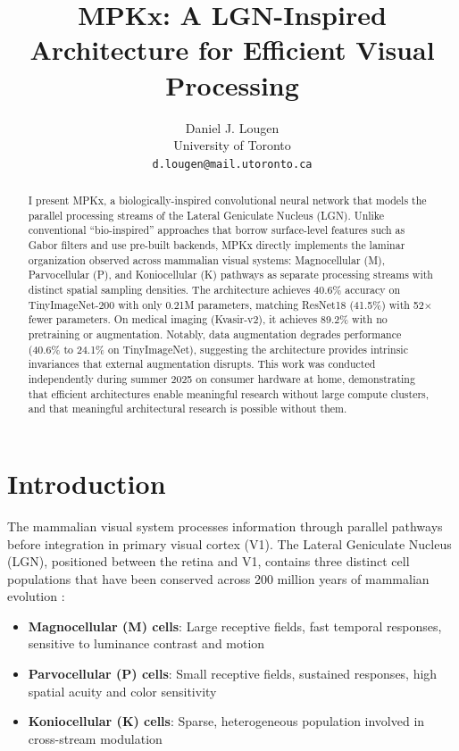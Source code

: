 \documentclass{article}
\title{MPKx: A LGN-Inspired Architecture for Efficient Visual Processing}
\author{
  Daniel J. Lougen \\
  University of Toronto \\
  \texttt{d.lougen@mail.utoronto.ca}
}
\date{}
\begin{document}
\maketitle

\begin{abstract}
I present MPKx, a biologically-inspired convolutional neural network that models the parallel processing streams of the Lateral Geniculate Nucleus (LGN). Unlike conventional ``bio-inspired'' approaches that borrow surface-level features such as Gabor filters and use pre-built backends, MPKx directly implements the laminar organization observed across mammalian visual systems: Magnocellular (M), Parvocellular (P), and Koniocellular (K) pathways as separate processing streams with distinct spatial sampling densities. The architecture achieves 40.6\% accuracy on TinyImageNet-200 with only 0.21M parameters, matching ResNet18 (41.5\%) with 52$\times$ fewer parameters. On medical imaging (Kvasir-v2), it achieves 89.2\% with no pretraining or augmentation. Notably, data augmentation degrades performance (40.6\% to 24.1\% on TinyImageNet), suggesting the architecture provides intrinsic invariances that external augmentation disrupts. This work was conducted independently during summer 2025 on consumer hardware at home, demonstrating that efficient architectures enable meaningful research without large compute clusters, and that meaningful architectural research is possible without them.
\end{abstract}

\section{Introduction}

The mammalian visual system processes information through parallel pathways before integration in primary visual cortex (V1). The Lateral Geniculate Nucleus (LGN), positioned between the retina and V1, contains three distinct cell populations that have been conserved across 200 million years of mammalian evolution \citep{solomon2021}:

\begin{itemize}
    \item \textbf{Magnocellular (M) cells}: Large receptive fields, fast temporal responses, sensitive to luminance contrast and motion
    \item \textbf{Parvocellular (P) cells}: Small receptive fields, sustained responses, high spatial acuity and color sensitivity
    \item \textbf{Koniocellular (K) cells}: Sparse, heterogeneous population involved in cross-stream modulation
\end{itemize}
\end{document}
